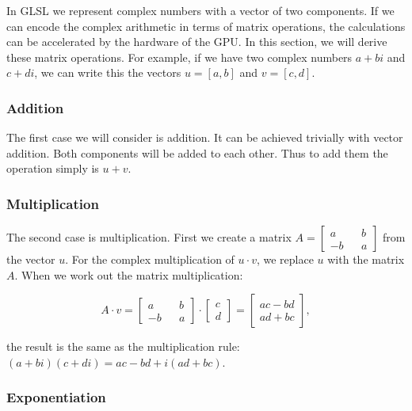 \documentclass[11pt]{article}
\begin{document}
    In GLSL we represent complex numbers with a vector of two components. If
we can encode the complex arithmetic in terms of matrix operations, the
calculations can be accelerated by the hardware of the GPU. In this
section, we will derive these matrix operations. For example, if we have
two complex numbers \(a + bi\) and \(c + di\), we can write this the
vectors \(u = [a, b]\) and \(v = [c, d]\).

\hypertarget{addition}{%
\subsubsection{Addition}\label{addition}}

The first case we will consider is addition. It can be achieved
trivially with vector addition. Both components will be added to each
other. Thus to add them the operation simply is \(u+v\).

\hypertarget{multiplication}{%
\subsubsection{Multiplication}\label{multiplication}}

The second case is multiplication. First we create a matrix
\(A = \begin{bmatrix} a && b \\ -b && a \end{bmatrix}\) from the vector
\(u\). For the complex multiplication of \(u\cdot v\), we replace \(u\)
with the matrix \(A\). When we work out the matrix multiplication:

\[ A\cdot v =  \begin{bmatrix} a && b \\ -b && a \end{bmatrix} \cdot \begin{bmatrix}c \\ d \end{bmatrix} = \begin{bmatrix} ac-bd \\ ad+bc \end{bmatrix},\]

the result is the same as the multiplication rule:
\((a + bi)(c + di) = ac - bd + i(ad + bc)\).

\hypertarget{exponentiation}{%
\subsubsection{Exponentiation}\label{exponentiation}}
\end{document}
